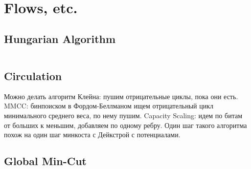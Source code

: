 \section{Flows, etc.}

\subsection{Hungarian Algorithm}

\inputminted{cpp}{\code/hungarian.cpp}

\subsection{Circulation}

Можно делать алгоритм Клейна: пушим отрицательные циклы, пока они есть. MMCC: бинпоиском в Фордом-Беллманом ищем отрицательный цикл минимального среднего веса, по нему пушим. Capacity Scaling: идем по битам от больших к меньшим, добавляем по одному ребру. Один шаг такого алгоритма похож на один шаг минкоста с Дейкстрой с потенциалами.

\subsection{Global Min-Cut}

\inputminted{cpp}{\code/stoer_wagner.cpp}
